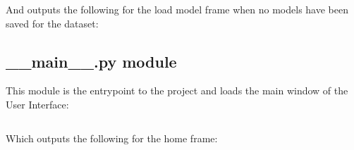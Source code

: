 \documentclass[./project-report/src/latex/project-report.tex]{subfiles}
\begin{document}
\begin{itemize}
        And outputs the following for the load model frame when no models have been saved for the dataset:

        \begin{figure}[h!]
        \centering
        \end{figure}
\end{itemize}

\subsection{\_\_main\_\_.py module}

This module is the entrypoint to the project and loads the main window of the User Interface:

\label{sec:__main__-module}
\inputminted{python}{./school_project/__main__.py}

Which outputs the following for the home frame:

\begin{figure}[h!]
\centering
{}
\end{figure}
\end{document}
